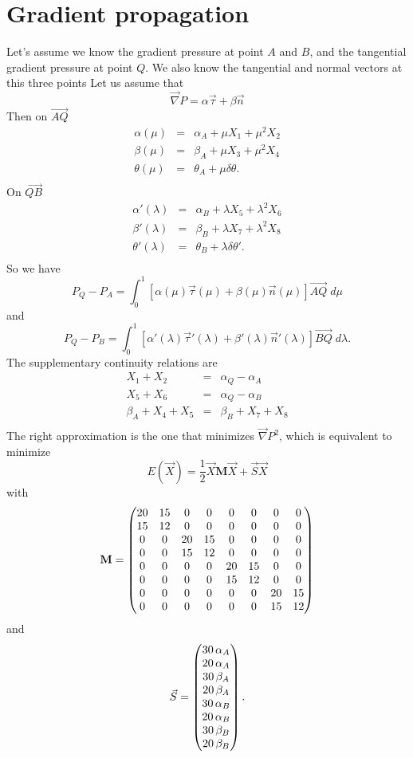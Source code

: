 \documentclass[11pt]{amsart}
\newcommand{\myvec}[1]{\overrightarrow{#1}}
\newcommand{\mygrad}{\vec{\nabla}}
\newcommand{\mymat}[1]{\mathbf{#1}}
\begin{document}
\section{Gradient propagation}
Let's assume we know the gradient pressure at point $A$ and $B$, and
the tangential gradient pressure at point $Q$.
We also know the tangential and normal vectors at this three points
Let us assume that
\[
	\mygrad P = \alpha \vec{\tau} + \beta \vec{n}
\]
Then on $\myvec{AQ}$
\[
	\begin{array}{rcl}
		\alpha(\mu) & = & \alpha_A + \mu X_1 + \mu^2 X_2\\
		\beta(\mu)  & = & \beta_A  + \mu X_3 + \mu^2 X_4 \\
		\theta(\mu) & = & \theta_A + \mu \delta \theta.\\
	\end{array}
\]
On $\myvec{QB}$
\[
	\begin{array}{rcl}
		\alpha'(\lambda) & = & \alpha_B + \lambda X_5 + \lambda^2 X_6\\
		\beta'(\lambda)  & = & \beta_B  + \lambda X_7 + \lambda^2 X_8 \\
		\theta'(\lambda) & = & \theta_B + \lambda \delta \theta'.\\
	\end{array}
\]
So we have
\[
	P_Q - P_A = \int_0^1 
	\left[ \alpha(\mu)\vec{\tau}(\mu) + \beta(\mu) \vec{n}(\mu)\right]\myvec{AQ} \; d\mu
\]
and
\[
	P_Q - P_B = \int_0^1 
	\left[ 
		\alpha'(\lambda)\vec{\tau}'(\lambda) + 
		\beta'(\lambda) \vec{n}'(\lambda)
	\right]
	\myvec{BQ} \; d\lambda.
\]
The supplementary continuity relations are
\[
	\begin{array}{rcl}
		X_1 + X_2 & = & \alpha_Q - \alpha_A\\
		X_5 + X_6 & = & \alpha_Q - \alpha_B\\
		\beta_A + X_4 + X_5 & = & \beta_B + X_7 + X_8\\
	\end{array}
\]
The right approximation is the one that minimizes $\mygrad P ^2$,
which is equivalent to minimize
\[
	E(\vec{X}) = \dfrac{1}{2} \vec{X}\mymat{M}\vec{X} + \vec{S}\vec{X}
\]
with
\[
	\mymat{M} = \begin{pmatrix}20 & 15 & 0 & 0 & 0 & 0 & 0 & 0\cr 15 & 12 & 0 & 0 & 0 & 0 & 0 & 0\cr 0 & 0 & 20 & 15 & 0 & 0 & 0 & 0\cr 0 & 0 & 15 & 12 & 0 & 0 & 0 & 0\cr 0 & 0 & 0 & 0 & 20 & 15 & 0 & 0\cr 0 & 0 & 0 & 0 & 15 & 12 & 0 & 0\cr 0 & 0 & 0 & 0 & 0 & 0 & 20 & 15\cr 0 & 0 & 0 & 0 & 0 & 0 & 15 & 12\end{pmatrix}
\]
and
\[\vec{S}=
\begin{pmatrix}30\,\alpha_A\cr 20\,\alpha_A\cr 30\,\beta_A\cr 20\,\beta_A\cr 30\,\alpha_B\cr 20\,\alpha_B\cr 30\,\beta_B\cr 20\,\beta_B\end{pmatrix}.
\]
\end{document}
